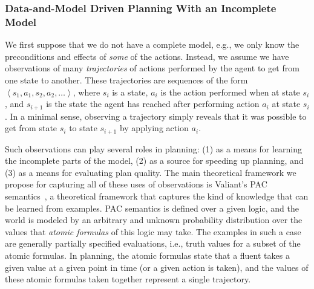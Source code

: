 \documentclass[12pt]{article}
\newcommand{\tuple}[1]{\ensuremath{\left \langle #1 \right \rangle }}
\begin{document}
\subsubsection{Data-and-Model Driven Planning With an Incomplete Model}
We first suppose that we do not have a complete model, e.g., we only know the preconditions and effects of {\em some} of the actions. Instead, we assume we have observations of many {\em trajectories} of actions performed by the agent to get from one state to another. These trajectories are sequences of the form $\tuple{ s_1, a_1, s_2, a_2, \ldots}$, where $s_i$ is a state, $a_i$ is the action performed when at state $s_i$, and $s_{i+1}$ is the state the agent has reached after performing action $a_i$ at state $s_i$. In a minimal sense, observing a trajectory simply reveals that it was possible to get from state $s_i$ to state $s_{i+1}$ by applying action $a_i$. %



Such observations can play several roles in planning: (1) as a means for learning the incomplete parts of the model, (2) as a source for speeding up planning, and (3) as a means for evaluating plan quality. 
The main theoretical framework we propose for capturing all of these uses of observations is Valiant's PAC semantics~\cite{valiant2000robustLogics}, a theoretical framework that captures the kind of knowledge that can be learned from examples. 
PAC semantics is defined over a given logic, and 
the world is modeled by an arbitrary and unknown probability distribution over the values that {\em atomic formulas} of this logic may take. The examples in such a case are generally partially specified evaluations, i.e., truth values for a subset of the atomic formulas. In planning, the atomic formulas state that a fluent takes a given value at a given point in time (or a given action is taken), and the values of these atomic formulas taken together represent a single trajectory.

\end{document}
